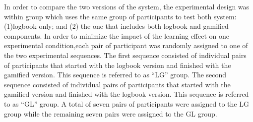 \documentclass{sig-alternate}
\begin{document}
In order to compare the two versions of the system, the experimental design was within group which uses the same group of participants to test both system: (1)logbook only; and (2) the one that includes both logbook and gamified components. In order to minimize the impact of the learning effect on one experimental condition,each pair of participant was randomly assigned to one of the two experimental sequences. The first sequence consisted of individual pairs of participants that started with the logbook version and finished with the gamified version. This sequence is referred to as ``LG'' group. The second sequence  consisted of individual pairs of participants that started with the gamified version and finished with the logbook version. This sequence is referred to as ``GL'' group. A total of seven pairs of participants were assigned to the LG group while the remaining seven pairs were assigned to the GL group. 
\end{document}

